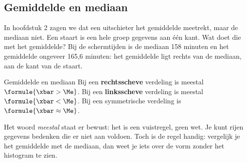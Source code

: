 \begin{oefeningen}
\end{oefeningen}

\subsection{Gemiddelde en mediaan}

In hoofdstuk 2 zagen we dat een uitschieter het gemiddelde meetrekt, maar de mediaan niet. Een staart is een hele groep gegevens aan één kant. Wat doet die met het gemiddelde? Bij de schermtijden is de mediaan 158 minuten en het gemiddelde ongeveer 165,6 minuten: het gemiddelde ligt rechts van de mediaan, aan de kant van de staart.

\begin{theorie}
\begin{stelling}{Gemiddelde en mediaan}
Bij een \textbf{\textcolor{accent}{rechtsscheve}} verdeling is meestal $\formule{\xbar > \Me}$. Bij een \textbf{\textcolor{accent}{linksscheve}} verdeling is meestal $\formule{\xbar < \Me}$. Bij een symmetrische verdeling is $\formule{\xbar \approx \Me}$.
\end{stelling}
\end{theorie}

Het woord \textit{meestal} staat er bewust: het is een vuistregel, geen wet. Je kunt rijen gegevens bedenken die er niet aan voldoen. Toch is de regel handig: vergelijk je het gemiddelde met de mediaan, dan weet je iets over de vorm zonder het histogram te zien.


